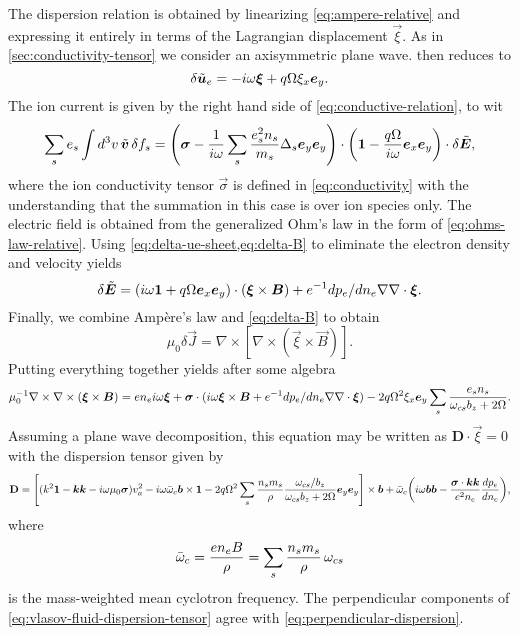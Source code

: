 \documentclass[aps,pre,notitlepage,amsmath,amssymb,amsfonts,nobibnotes,nofootinbib,superscriptaddress]{revtex4-1}
\begin{document}
The dispersion relation is obtained by linearizing \cref{eq:ampere-relative}
and expressing it entirely in terms of the Lagrangian displacement
$\vec{\xi}$. As in \cref{sec:conductivity-tensor} we consider an axisymmetric
plane wave.  then reduces to
\begin{equation}
  \label{eq:delta-ue-sheet}
  \delta\tvec{u}_e = -i\omega\vec{\xi} + q\Omega\xi_x\ey.
\end{equation}
The ion current is given by the right hand side of
\cref{eq:conductive-relation}, to wit
\begin{equation}
  \sums \qs\int d^3v\,\tvec{v}\,\delta f_s
  = \left(
    \vec{\sigma} - \frac{1}{i\omega}\sums\frac{\qs^2 n_s}{m_s}\Delta_s\ey\ey
  \right)\cdot\left(\mathbf{1} - \frac{q\Omega}{i\omega}\ex\ey\right)
  \cdot\delta\tvec{E},
\end{equation}
where the ion conductivity tensor $\vec{\sigma}$ is defined in
\cref{eq:conductivity} with the understanding that the summation in this case
is over ion species only. The electric field is obtained from the generalized
Ohm's law in the form of \cref{eq:ohms-law-relative}. Using
\cref{eq:delta-ue-sheet,eq:delta-B} to eliminate the electron density and
velocity yields
\begin{equation}
  \label{eq:ohm-linear-sheet}
  \delta\tvec{E}
  = (i\omega\mathbf{1} + q\Omega\ex\ey)\cdot(\vec{\xi}\times\vec{B})
  + e^{-1}d\pe/dn_e\nabla\nabla\cdot\vec{\xi}.
\end{equation}
Finally, we combine Ampère's law and \cref{eq:delta-B} to obtain
\begin{equation}
  \mu_0\delta\vec{J} = \nabla\times[\nabla\times(\vec{\xi}\times\vec{B})].
\end{equation}
Putting everything together yields after some algebra
\begin{equation}
  \label{eq:ampere-xi}
  \mu_0^{-1}\nabla\times\nabla\times(\vec{\xi}\times\vec{B}) =
  en_e i\omega\vec{\xi} + \vec{\sigma}\cdot(i\omega\vec{\xi}\times\vec{B}
  + e^{-1}d\pe/dn_e\nabla\nabla\cdot\vec{\xi})
  - 2q\Omega^2\xi_x\ey\sums\frac{\qs n_s}{\omega_{cs}b_z + 2\Omega}.
\end{equation}
Assuming a plane wave decomposition, this equation may be written as
$\mathbf{D}\cdot\vec{\xi}=0$ with the dispersion tensor given by
\begin{equation}
  \label{eq:vlasov-fluid-dispersion-tensor}
  \mathbf{D} =
  \left[
    (k^2\mathbf{1} - \vec{k}\vec{k} - i\omega\mu_0\vec{\sigma})\va^2
    - i\omega\ome\vec{b}\times\mathbf{1}
    - 2q\Omega^2\sums\frac{n_s m_s}{\rho}
    \frac{\omcs/b_z}{\omcs b_z + 2\Omega}\ey\ey
  \right]\times\vec{b}
  + \ome\left(
    i\omega\vec{b}\vec{b}
    - \frac{\vec{\sigma}\cdot\vec{k}\vec{k}}{e^2n_e}\der{\pe}{n_e}
  \right),
\end{equation}
where
\begin{equation}
  \bar{\omega}_c = \frac{en_e B}{\rho} = \sum_s\frac{n_s m_s}{\rho}\,\omega_{cs}
\end{equation}
is the mass-weighted mean cyclotron frequency. The perpendicular components of
\cref{eq:vlasov-fluid-dispersion-tensor} agree with
\cref{eq:perpendicular-dispersion}.


\end{document}
